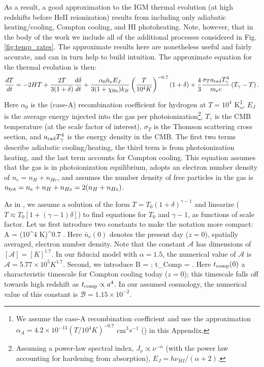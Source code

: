 As a result, a good approximation to the IGM thermal evolution (at high redshifts before HeII reionization) results
from including only adiabatic heating/cooling, Compton cooling, and HI photoheating. Note, however, that in the body of
the work we include all of the additional processes considered in Fig. \ref{fig:temp_rates}. The approximate
results here are nonetheless useful and fairly accurate, and can in turn help to build intuition.
The approximate equation for the thermal evolution is then:
\begin{align}
\frac{dT}{dt} = -2 H T + \frac{2 T}{3 (1+\delta)}\frac{d\delta}{dt} + \frac{\alpha_0 \bar{n}_e E_J}{3 (1 + \chi_{\rm He}) k_B} \left(\frac{T}{10^4 K}\right)^{-0.7} (1 + \delta) 
 + \frac{4}{3}\frac{\sigma_T a_{\rm rad} T_\gamma^4}{m_e c} \left(T_\gamma - T \right).
\label{eq:tev_approx}
\end{align}
Here $\alpha_0$ is the (case-A) recombination coefficient for hydrogen at $T=10^4$ K\footnote{We assume the case-A recombination coefficient and use the approximation $\alpha_A = 4.2 \times 10^{-13} (T/10^4 K)^{-0.7}$ cm$^3 s^{-1}$ (\citealt{Hui:1997dp}) in this Appendix.}, $E_J$ is the average energy injected into the gas
per photoionization\footnote{Assuming a power-law spectral index, $J_\nu \propto \nu^{-\alpha}$ (with the power law accounting for hardening
from absorption), $E_J=h \nu_{HI}/(\alpha+2)$.}, $T_\gamma$ is the CMB temperature (at the scale factor of interest), $\sigma_T$ is the Thomson scattering cross
section, and $a_{\rm rad} T_\gamma^4$ is the energy
density in the CMB. The first two terms describe adiabatic cooling/heating, the third term is from photoionization heating,
and the last term accounts for Compton cooling. This equation assumes that the gas is in photoionization equilibrium, adopts an 
electron number density of $n_e = n_H + n_{He}$, and assumes the number density of free particles in the gas is $n_{\rm tot} = n_e + n_H + n_{He} =
2 (n_H + n_{He})$.

As in \citet{Hui:1997dp}, we assume a solution of the form $T = T_0 (1 + \delta)^{\gamma-1}$ and linearize ($T \approx T_0 [1+ (\gamma -1) \delta]$) to find equations
for $T_0$ and $\gamma-1$, as functions of scale factor. Let us first introduce two constants to make the notation more compact:
\beqa
{\mathcal A} = (10^4 K)^{0.7} .
\label{eq:adef}
\eeqa
Here $\bar{n}_e(0)$ denotes the present day ($z=0$), spatially averaged, electron number density.
Note that the constant ${\mathcal A}$ has dimensions of $[{\mathcal A}] = [K]^{1.7}$. In our fiducial model with $\alpha=1.5$, the
numerical value of ${\mathcal A}$ is 
${\mathcal A} = 5.77 \times 10^5 K^{1.7}$. Second, we introduce
\beqa
{\mathcal B} = ; \quad
t_{\rm Comp} = .
\label{eq:bdef}
\eeqa
Here $t_{\rm comp}(0)$ a characteristic timescale for Compton cooling today ($z=0$); this timescale falls off towards high redshift as 
$t_{\rm comp} \propto a^4$.  In our assumed cosmology, the numerical value of this constant is ${\mathcal B} = 1.15 \times 10^{-2}$.

